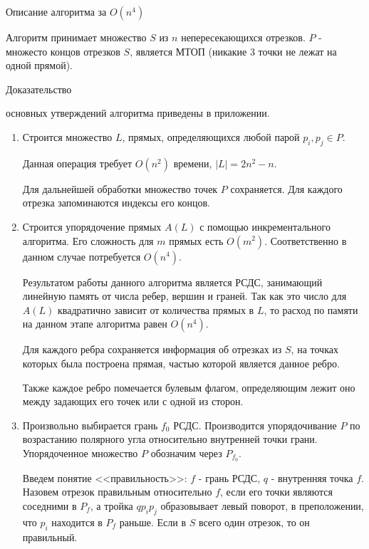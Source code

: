 \documentclass[letterpaper,12pt]{article}
\begin{document}
\begin{center}
Описание алгоритма за $O(n^4)$
\end{center}

Алгоритм принимает множество $S$ из $n$ непересекающихся отрезков.
$P$ - множесто концов отрезков $S$, является МТОП (никакие 3 точки не
лежат на одной прямой).

\hypertarget{proof}{Доказательство} основных утверждений алгоритма приведены в приложении.

\begin{enumerate}
      \item Строится множество $L$, прямых, определяющихся любой парой 
            $p_i, p_j \in P$.
            
            Данная операция требует $O(n^2)$ времени, $|L| = 2n^2-n$.
            
            Для дальнейшей обработки множество точек $P$ сохраняется.
            Для каждого отрезка запоминаются индексы его концов.
      \item Строится упорядочение прямых $A(L)$ с помощью 
            инкрементального алгоритма. Его сложность для $m$ прямых есть 
            \hyperlink{literature_1}{$O(m^2)$}. Соответственно в данном 
            случае потребуется $O(n^4)$.
            
            Результатом работы данного алгоритма является РСДС,
            занимающий линейную память от числа ребер, вершин и граней.
            Так как это число для $A(L)$ квадратично зависит от количества
            прямых в $L$, то расход по памяти на данном этапе алгоритма 
            равен $O(n^4)$.

            Для каждого ребра сохраняется информация об отрезках из $S$,
            на точках которых была построена прямая, частью которой 
            является данное ребро. 
            
            Также каждое ребро помечается булевым флагом, определяющим 
            лежит оно между задающих его точек или с одной из сторон.
      \item Произвольно выбирается грань $f_0$ РСДС. Производится
            упорядочивание $P$ по возрастанию полярного угла
            относительно внутренней точки грани.
            Упорядоченное множество $P$ обозначим через $P_{f_0}$.
            
            Введем понятие <<правильность>>:
            $f$ - грань РСДС, $q$ - внутренняя точка $f$.
            Назовем отрезок правильным относительно $f$, если 
            его точки являются соседними в $P_f$, а тройка $q p_i p_j$ 
            образовывает левый поворот, в преположении, что $p_i$ находится 
            в $P_f$ раньше. Если в $S$ всего один отрезок, то он правильный.


\end{enumerate}
\end{document}
